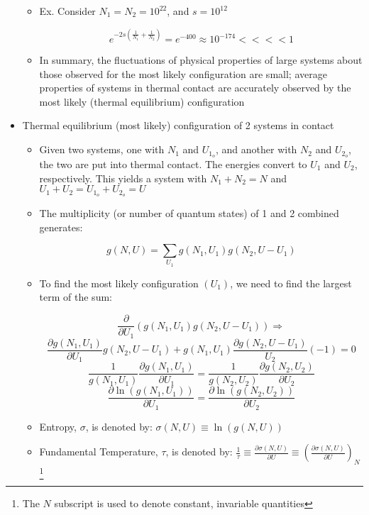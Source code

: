\begin{itemize}
\begin{itemize}
      \item Ex. Consider $N_1=N_2=10^{22}$, and $s=10^{12}$


        $$e^{-2s\left( \frac{1}{N_1}+\frac{1}{N_2} \right)}=e^{-400}\approx 10^{-174}<<<< 1$$

      \item In summary, the fluctuations of physical properties of large systems about those observed for the most likely configuration are small; average properties of systems in thermal contact are accurately observed by the most likely (thermal equilibrium) configuration

    \end{itemize}

  \item Thermal equilibrium (most likely) configuration of 2 systems in contact

    \begin{itemize}

      \item Given two systems, one with $N_1$ and $U_{1_o}$, and another with $N_2$ and $U_{2_o}$, the two are put into thermal contact. The energies convert to $U_1$ and $U_2$, respectively. This yields a system with $N_1+N_2=N$ and $U_1+U_2=U_{1_o}+U_{2_o}=U$

      \item The multiplicity (or number of quantum states) of 1 and 2 combined generates:

        $$g(N,U)=\sum_{U_1}g(N_1,U_1)g(N_2,U-U_1)$$

      \item To find the most likely configuration $(U_1)$, we need to find the largest term of the sum:

        $$\frac{\partial}{\partial U_1}\left( g(N_1,U_1)g(N_2,U-U_1) \right)\Rightarrow$$
        $$\frac{\partial g(N_1,U_1)}{\partial U_1}g(N_2,U-U_1)+g(N_1,U_1)\frac{\partial g(N_2,U-U_1)}{U_2}(-1)=0$$
        $$\frac{1}{g(N_1,U_1)}\frac{\partial g(N_1,U_1)}{\partial U_1}=\frac{1}{g(N_2,U_2)}\frac{\partial g(N_2,U_2)}{\partial U_2}$$
        $$\frac{\partial \ln(g(N_1,U_1))}{\partial U_1}=\frac{\partial \ln(g(N_2,U_2))}{\partial U_2}$$

      \item Entropy, $\sigma$, is denoted by: $\sigma(N,U)\equiv\ln(g(N,U))$

      \item Fundamental Temperature, $\tau$, is denoted by: $\frac{1}{\tau}\equiv\frac{\partial \sigma(N,U)}{\partial U}\equiv\left( \frac{\partial \sigma(N,U)}{\partial U}\right)_N$\footnote{The $N$ subscript is used to denote constant, invariable quantities}


\end{itemize}
\end{itemize}
